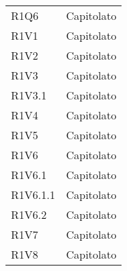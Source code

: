 \begin{longtable}{|C{6.5cm}|C{6.5cm}|}
	R1Q6 & Capitolato \\
	
	R1V1 & Capitolato \\
	
	R1V2 & Capitolato \\
	
	R1V3 & Capitolato \\
	
	R1V3.1 & Capitolato \\
	
	R1V4 & Capitolato \\
	
	R1V5 & Capitolato \\
	
	R1V6 & Capitolato \\
	
	R1V6.1 & Capitolato \\
	
	R1V6.1.1 & Capitolato \\
	
	R1V6.2 & Capitolato \\
	
	R1V7 & Capitolato \\
	R1V8 & Capitolato \\
	
	\hline
	
\end{longtable}